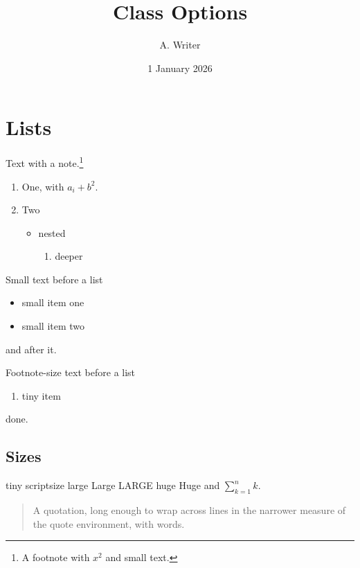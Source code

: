 \documentclass[12pt]{article}
\begin{document}
\title{Class Options}\author{A. Writer}\date{1 January 2026}\maketitle
\section{Lists}
Text with a note.\footnote{A footnote with $x^2$ and \small small text.}
\begin{enumerate}
\item One, with $a_i + b^2$.
\item Two
  \begin{itemize}
  \item nested
    \begin{enumerate}
    \item deeper
    \end{enumerate}
  \end{itemize}
\end{enumerate}
{\small Small text before a list
\begin{itemize}
\item small item one
\item small item two
\end{itemize}
and after it.}
{\footnotesize Footnote-size text before a list
\begin{enumerate}
\item tiny item
\end{enumerate}
done.}
\subsection{Sizes}
{\tiny tiny} {\scriptsize scriptsize} {\large large} {\Large Large} {\LARGE LARGE} {\huge huge} {\Huge Huge} and $\sum_{k=1}^n k$.
\begin{quote}
A quotation, long enough to wrap across lines in the narrower measure of the quote environment, with words.
\end{quote}
\end{document}
